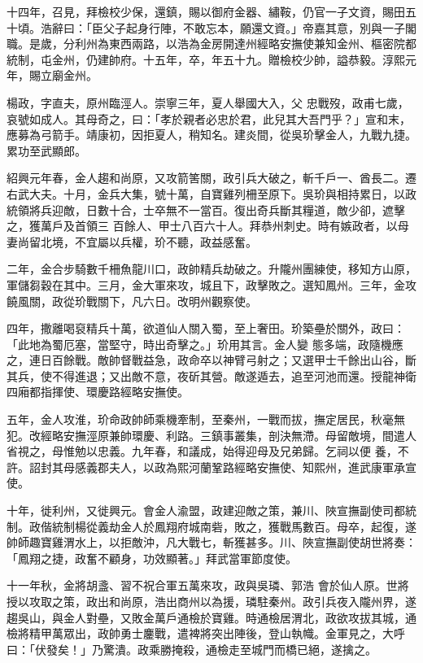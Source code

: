 \begin{pinyinscope}
 十四年，召見，拜檢校少保，還鎮，賜以御府金器、繡鞍，仍官一子文資，賜田五十頃。浩辭曰：「臣父子起身行陣，不敢忘本，願還文資。」帝嘉其意，別與一子閣職。是歲，分利州為東西兩路，以浩為金房開達州經略安撫使兼知金州、樞密院都統制，屯金州，仍建帥府。十五年，卒，年五十九。贈檢校少帥，謚恭毅。淳熙元年，賜立廟金州。



 楊政，字直夫，原州臨涇人。崇寧三年，夏人舉國大入，父
 忠戰歿，政甫七歲，哀號如成人。其母奇之，曰：「孝於親者必忠於君，此兒其大吾門乎？」宣和末，應募為弓箭手。靖康初，因拒夏人，稍知名。建炎間，從吳玠擊金人，九戰九捷。累功至武顯郎。



 紹興元年春，金人趨和尚原，又攻箭筈關，政引兵大破之，斬千戶一、酋長二。遷右武大夫。十月，金兵大集，號十萬，自寶雞列柵至原下。吳玠與相持累日，以政統領將兵迎敵，日數十合，士卒無不一當百。復出奇兵斷其糧道，敵少卻，遮擊之，獲萬戶及首領三
 百餘人、甲士八百六十人。拜恭州刺史。時有嫉政者，以母妻尚留北境，不宜屬以兵權，玠不聽，政益感奮。



 二年，金合步騎數千柵魚龍川口，政帥精兵劫破之。升隴州團練使，移知方山原，軍儲芻穀在其中。三月，金大軍來攻，城且下，政擊敗之。選知鳳州。三年，金攻饒風關，政從玠戰關下，凡六日。改明州觀察使。



 四年，撒離喝裒精兵十萬，欲道仙人關入蜀，至上奢田。玠築壘於關外，政曰：「此地為蜀厄塞，當堅守，時出奇擊之。」玠用其言。金人變
 態多端，政隨機應之，連日百餘戰。敵帥督戰益急，政命卒以神臂弓射之；又選甲士千餘出山谷，斷其兵，使不得進退；又出敵不意，夜斫其營。敵遂遁去，追至河池而還。授龍神衛四廂都指揮使、環慶路經略安撫使。



 五年，金人攻淮，玠命政帥師乘機牽制，至秦州，一戰而拔，撫定居民，秋毫無犯。改經略安撫涇原兼帥環慶、利路。三鎮事叢集，剖決無滯。母留敵境，間遣人省視之，母惟勉以忠義。九年春，和議成，始得迎母及兄弟歸。乞祠以便
 養，不許。詔封其母感義郡夫人，以政為熙河蘭鞏路經略安撫使、知熙州，進武康軍承宣使。



 十年，徙利州，又徙興元。會金人渝盟，政建迎敵之策，兼川、陜宣撫副使司都統制。政偕統制楊從義劫金人於鳳翔府城南砦，敗之，獲戰馬數百。母卒，起復，遂帥師趣寶雞渭水上，以拒敵沖，凡大戰七，斬獲甚多。川、陜宣撫副使胡世將奏：「鳳翔之捷，政奮不顧身，功效顯著。」拜武當軍節度使。



 十一年秋，金將胡盞、習不祝合軍五萬來攻，政與吳璘、郭浩
 會於仙人原。世將授以攻取之策，政出和尚原，浩出商州以為援，璘駐秦州。政引兵夜入隴州界，遂趨吳山，與金人對壘，又敗金萬戶通檢於寶雞。時通檢居渭北，政欲攻拔其城，通檢將精甲萬眾出，政帥勇士鏖戰，遣裨將突出陣後，登山執幟。金軍見之，大呼曰：「伏發矣！」乃驚潰。政乘勝掩殺，通檢走至城門而橋已絕，遂擒之。




\end{pinyinscope}

